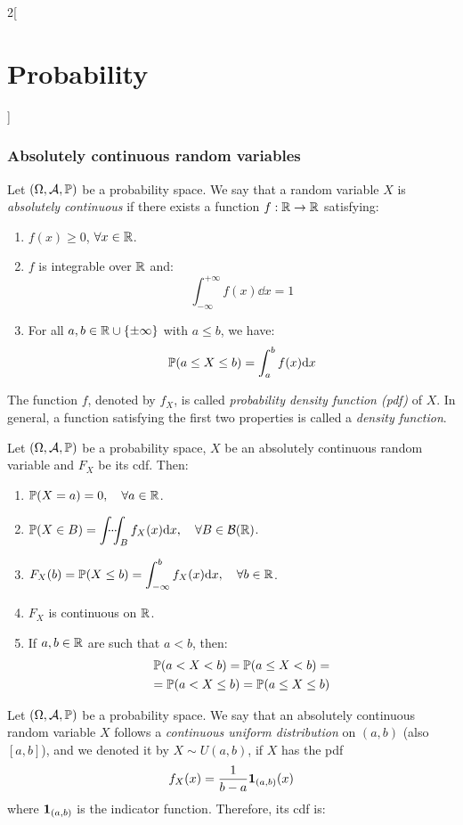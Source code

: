 \documentclass[../../../main.tex]{subfiles}
\begin{document}
\begin{multicols}{2}[\section{Probability}]
    \subsubsection{Absolutely continuous random variables}
    \begin{definition}
        Let $(\Omega,\mathcal{A},\mathbb{P})$ be a probability space. We say that a random variable $X$ is \textit{absolutely continuous} if there exists a function $f:\mathbb{R}\rightarrow\mathbb{R}$ satisfying:
        \begin{enumerate}
            \item $f(x)\geq 0$, $\forall x\in\mathbb{R}$.
            \item $f$ is integrable over $\mathbb{R}$ and: $$\int_{-\infty}^{+\infty}f(x)\dd x=1$$
            \item For all $a,b\in\mathbb{R}\cup\{\pm\infty\}$ with $a\leq b$, we have: $$\mathbb{P}(a\leq X\leq b)=\int_a^bf(x)\dd x$$
        \end{enumerate}
        The function $f$, denoted by $f_X$, is called \textit{probability density function (pdf)} of $X$. In general, a function satisfying the first two properties is called a \textit{density function}.
    \end{definition}
    \begin{prop}
        Let $(\Omega,\mathcal{A},\mathbb{P})$ be a probability space, $X$ be an absolutely continuous random variable and $F_X$ be its cdf. Then:
        \begin{enumerate}
            \item $\mathbb{P}(X=a)=0,\quad\forall a\in \mathbb{R}$.
            \item $\displaystyle \Prob(X\in B)=\dotsint_Bf_X(x)\dd x,\quad\forall B\in\mathcal{B}(\RR)$.
            \item $\displaystyle F_X(b)=\mathbb{P}(X\leq b)=\int_{-\infty}^bf_X(x)\dd x,\quad\forall b\in\mathbb{R}$.
            \item $F_X$ is continuous on $\mathbb{R}$.
            \item If $a,b\in\mathbb{R}$ are such that $a<b$, then:
                  \begin{multline*}
                      \mathbb{P}(a<X<b)=\mathbb{P}(a\leq X<b)=\\=\mathbb{P}(a<X\leq b)=\mathbb{P}(a\leq X\leq b)
                  \end{multline*}
        \end{enumerate}
    \end{prop}
    \begin{definition}
        Let $(\Omega,\mathcal{A},\mathbb{P})$ be a probability space. We say that an absolutely continuous random variable $X$ follows a \textit{continuous uniform distribution} on $(a,b)$ (also $[a,b]$), and we denoted it by $X\sim U(a,b)$, if $X$ has the pdf $$f_X(x)=\frac{1}{b-a}\boldsymbol{\mathrm{1}}_{(a,b)}(x)$$ where $\boldsymbol{\mathrm{1}}_{(a,b)}$ is the indicator function. Therefore, its cdf is:

\end{definition}
\end{multicols}
\end{document}
